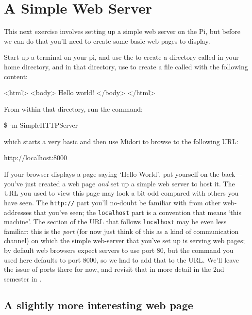 \section{A Simple Web Server}

This next exercise involves setting up a simple web server on the Pi, but before we can do that you'll need to create some basic web pages to display. 

Start up a terminal on your pi, and use the  to create a directory called  in your home directory, and in that directory, use  to create a file called  with the following content:

\begin{ttoutenv}
<html>
  <body>
    Hello world!
  </body>
</html>
\end{ttoutenv}

From within that directory, run the command:

\begin{ttoutenv}
\$  -m SimpleHTTPServer
\end{ttoutenv}

which starts a very basic  and then use Midori to browse to the following URL:

\begin{ttoutenv}
http://localhost:8000
\end{ttoutenv}

If your browser displays a page saying `Hello World', pat yourself on the back---you've just created a web page \textit{and} set up a simple web server to host it. The URL you used to view this page may look a bit odd compared with others you have seen. The \texttt{http://} part you'll no-doubt be familiar with from other web-addresses that you've seen; the \texttt{localhost} part is a convention that means `this machine'. The section of the URL that follows \texttt{localhost} may be even less familiar: this is the \textit{port} (for now just think of this as a kind of communication channel) on which the simple web-server that you've set up is serving web pages; by default web browsers expect servers to use port 80, but the  command you used here defaults to port 8000, so we had to add that to the URL. We'll leave the issue of ports there for now, and revisit that in more detail in the 2nd semester in . 

\subsection{A slightly more interesting web page}

